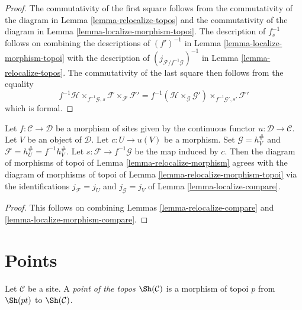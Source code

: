 \begin{proof}
The commutativity of the first square follows from the commutativity of
the diagram in
Lemma \ref{lemma-relocalize-topos}
and the commutativity of the diagram in
Lemma \ref{lemma-localize-morphism-topoi}.
The description of $f_s^{-1}$ follows on combining the descriptions
of $(f')^{-1}$ in
Lemma \ref{lemma-localize-morphism-topoi}
with the description of
$(j_{\mathcal{F}/f^{-1}\mathcal{G}})^{-1}$ in
Lemma \ref{lemma-relocalize-topos}.
The commutativity of the last square then follows from the
equality
$$
f^{-1}\mathcal{H} \times_{f^{-1}\mathcal{G}, s} \mathcal{F}
\times_\mathcal{F} \mathcal{F}'
=
f^{-1}(\mathcal{H} \times_\mathcal{G} \mathcal{G}')
\times_{f^{-1}\mathcal{G}', s'} \mathcal{F}'
$$
which is formal.
\end{proof}

\begin{lemma}
\label{lemma-relocalize-morphism-compare}
Let $f : \mathcal{C} \to \mathcal{D}$ be a morphism of sites given
by the continuous functor $u : \mathcal{D} \to \mathcal{C}$.
Let $V$ be an object of $\mathcal{D}$. Let $c : U \to u(V)$ be a morphism.
Set $\mathcal{G} = h_V^\#$ and $\mathcal{F} = h_U^\# = f^{-1}h_V^\#$.
Let $s : \mathcal{F} \to f^{-1}\mathcal{G}$ be the map induced by $c$.
Then the diagram of morphisms of topoi of
Lemma \ref{lemma-relocalize-morphism}
agrees with the diagram of morphisms of topoi of
Lemma \ref{lemma-relocalize-morphism-topoi}
via the identifications $j_\mathcal{F} = j_U$
and $j_\mathcal{G} = j_V$ of
Lemma \ref{lemma-localize-compare}.
\end{lemma}

\begin{proof}
This follows on combining
Lemmas \ref{lemma-relocalize-compare} and
\ref{lemma-localize-morphism-compare}.
\end{proof}


















\section{Points}
\label{section-points}

\begin{definition}
\label{definition-point-topos}
Let $\mathcal{C}$ be a site.
A {\it point of the topos $\Sh(\mathcal{C})$}
is a morphism of topoi $p$ from $\Sh(pt)$ to
$\Sh(\mathcal{C})$.
\end{definition}


